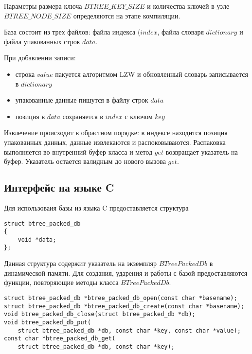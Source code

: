 \documentclass[14pt, russian]{scrartcl}
\begin{document}
Параметры размера ключа $BTREE\_KEY\_SIZE$ и количества ключей в узле $BTREE\_NODE\_SIZE$ определяются на этапе компиляции.

База состоит из трех файлов: файла индекса ($index$, файла словаря $dictionary$ и файла упакованных строк $data$. 

При добавлении записи:

\begin{itemize}
    \item строка $value$ пакуется алгоритмом LZW и обновленный словарь записывается в $dictionary$
    \item упакованные данные пишутся в файлу строк $data$
    \item позиция в $data$ сохраняется в $index$ с ключом $key$
\end{itemize}

Извлечение происходит в обрастном порядке: в индексе находится позиция упакованных данных, данные извлекаются и распоковываются. Распаковка выполняется во внутренний буфер класса и метод $get$ возвращает указатель на буфер. Указатель остается валидным до нового вызова $get$.

\subsection{Интерфейс на языке C}

Для использоваия базы из языка C предоставляется структура 

\begin{verbatim}
struct btree_packed_db
{
    void *data;
};
\end{verbatim}

Данная структура содержит указатель на экземпляр $BTreePackedDb$ в динамической памяти. Для создания, ударения и работы с базой предоставляются функции, повторяющие методы класса $BTreePackedDb$.

\begin{verbatim}
struct btree_packed_db *btree_packed_db_open(const char *basename);
struct btree_packed_db *btree_packed_db_create(const char *basename);
void btree_packed_db_close(struct btree_packed_db *db);
void btree_packed_db_put(
    struct btree_packed_db *db, const char *key, const char *value);
const char *btree_packed_db_get(
    struct btree_packed_db *db, const char *key);
\end{verbatim}
\end{document}
